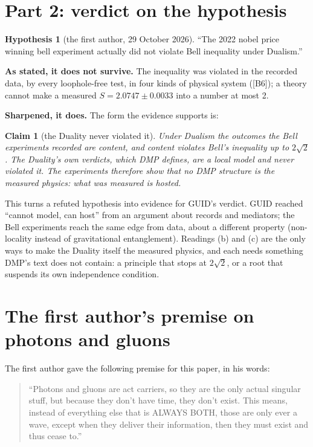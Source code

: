 \documentclass[11pt,a4paper]{article}
\newtheorem{claim}{Claim}
\theoremstyle{definition}
\newtheorem{hypothesis}{Hypothesis}
\theoremstyle{remark}
\newcommand{\chk}[1]{\textsf{[#1]}}
\begin{document}
\section{Part 2: verdict on the hypothesis}\label{sec:verdict}

\begin{hypothesis}[the first author, 29 October 2026]\label{hy:bell}
``The 2022 nobel price winning bell experiment actually did not violate Bell inequality under Dualism.''
\end{hypothesis}

\noindent\textbf{As stated, it does not survive.} The inequality was violated in the recorded data, by every loophole-free test, in
four kinds of physical system (\chk{B6}); a theory cannot make a measured $S=2.0747\pm0.0033$ into a number at most 2.

\noindent\textbf{Sharpened, it does.} The form the evidence supports is:

\begin{claim}[the Duality never violated it]\label{cl:bell}
Under Dualism the outcomes the Bell experiments recorded are content, and content violates Bell's inequality up to $2\sqrt2$. The
Duality's own verdicts, which DMP defines, are a local model and never violated it. The experiments therefore show that no DMP structure
is the measured physics: what was measured is hosted.
\end{claim}

\noindent This turns a refuted hypothesis into evidence for GUID's verdict. GUID reached ``cannot model, can host'' from an argument about
records and mediators; the Bell experiments reach the same edge from data, about a different property (non-locality instead of
gravitational entanglement). Readings (b) and (c) are the only ways to make the Duality itself the measured physics, and each needs
something DMP's text does not contain: a principle that stops at $2\sqrt2$, or a root that suspends its own independence condition.

\section{The first author's premise on photons and gluons}\label{sec:photons}

The first author gave the following premise for this paper, in his words:

\begin{quote}
``Photons and gluons are act carriers, so they are the only actual singular stuff, but because they don't have time, they don't exist.
This means, instead of everything else that is ALWAYS BOTH, those are only ever a wave, except when they deliver their information, then
they must exist and thus cease to.''
\end{quote}
\end{document}
